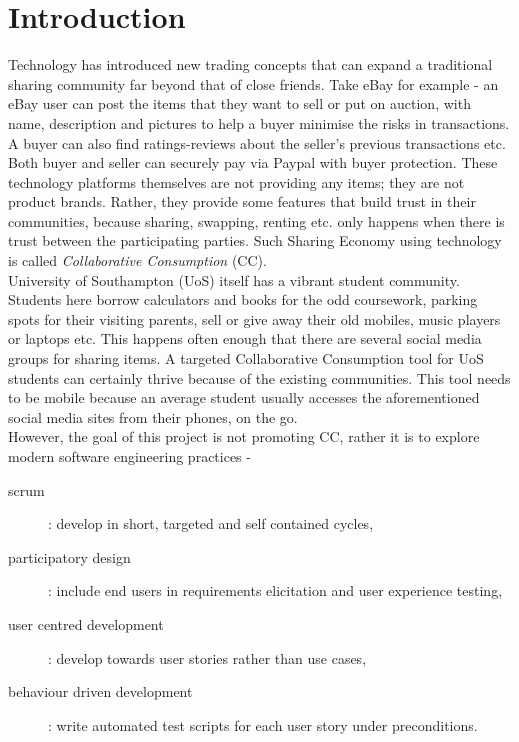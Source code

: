 \chapter{Introduction}

Technology has introduced new trading concepts that can expand a traditional sharing community far beyond that of close friends. Take eBay for example - an eBay user can post the items that they want to sell or put on auction,  with name, description and pictures to help a buyer minimise the risks in transactions. A buyer can also find ratings-reviews about the seller's previous transactions etc. Both buyer and seller can securely pay via Paypal with buyer protection. These technology platforms themselves are not providing any items; they are not product brands. Rather, they provide some features that build trust in their communities, because sharing, swapping, renting etc. only happens when there is trust between the participating parties. Such Sharing Economy using technology is called \textit{Collaborative Consumption} (CC).\\

University of Southampton (UoS) itself has a vibrant student community. Students here borrow calculators and books for the odd coursework, parking spots for their visiting parents, sell or give away their old mobiles, music players or laptops etc. This happens often enough that there are several social media groups for sharing items. A targeted Collaborative Consumption tool for UoS students can certainly thrive because of the existing communities. This tool needs to be mobile because an average student usually accesses the aforementioned social media sites from their phones, on the go.\\

However, the goal of this project is not promoting CC, rather it is to explore modern software engineering practices - 

\begin{description}
	\item [scrum] : develop in short, targeted and self contained cycles,
	\item [participatory design] : include end users in requirements elicitation and user experience testing,
	\item [user centred development] : develop towards user stories rather than use cases,
	\item [behaviour driven development] : write automated test scripts for each user story under preconditions.
\end{description}

